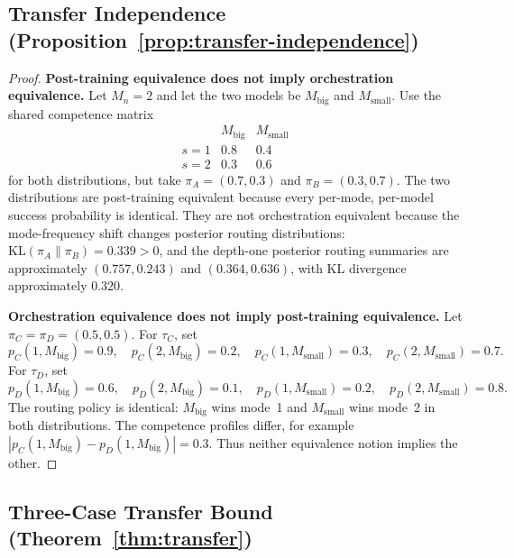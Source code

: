 \documentclass[twoside,11pt]{article}
\newcommand{\KL}{\mathrm{KL}}
\newcommand{\Mn}{M_n}
\begin{document}
\subsection{Transfer Independence (Proposition~\ref{prop:transfer-independence})}
\label{app:transfer-independence}

\begin{proof}
\noindent\textbf{Post-training equivalence does not imply orchestration equivalence.}
Let \(\Mn=2\) and let the two models be \(M_{\mathrm{big}}\) and \(M_{\mathrm{small}}\).
Use the shared competence matrix
\[
\begin{array}{c|cc}
&M_{\mathrm{big}}&M_{\mathrm{small}}\\
\hline
s=1&0.8&0.4\\
s=2&0.3&0.6
\end{array}
\]
for both distributions, but take \(\pi_A=(0.7,0.3)\) and \(\pi_B=(0.3,0.7)\).
The two distributions are post-training equivalent because every per-mode, per-model success probability is identical.
They are not orchestration equivalent because the mode-frequency shift changes posterior routing distributions: \(\KL(\pi_A\|\pi_B)=0.339>0\), and the depth-one posterior routing summaries are approximately \((0.757,0.243)\) and \((0.364,0.636)\), with KL divergence approximately \(0.320\).

\noindent\textbf{Orchestration equivalence does not imply post-training equivalence.}
Let \(\pi_C=\pi_D=(0.5,0.5)\).
For \(\tau_C\), set
\[
p_C(1,M_{\mathrm{big}})=0.9,\quad
p_C(2,M_{\mathrm{big}})=0.2,\quad
p_C(1,M_{\mathrm{small}})=0.3,\quad
p_C(2,M_{\mathrm{small}})=0.7.
\]
For \(\tau_D\), set
\[
p_D(1,M_{\mathrm{big}})=0.6,\quad
p_D(2,M_{\mathrm{big}})=0.1,\quad
p_D(1,M_{\mathrm{small}})=0.2,\quad
p_D(2,M_{\mathrm{small}})=0.8.
\]
The routing policy is identical: \(M_{\mathrm{big}}\) wins mode~1 and \(M_{\mathrm{small}}\) wins mode~2 in both distributions.
The competence profiles differ, for example
\(|p_C(1,M_{\mathrm{big}})-p_D(1,M_{\mathrm{big}})|=0.3\).
Thus neither equivalence notion implies the other.
\end{proof}

\subsection{Three-Case Transfer Bound (Theorem~\ref{thm:transfer})}
\label{app:transfer-proof}
\end{document}
